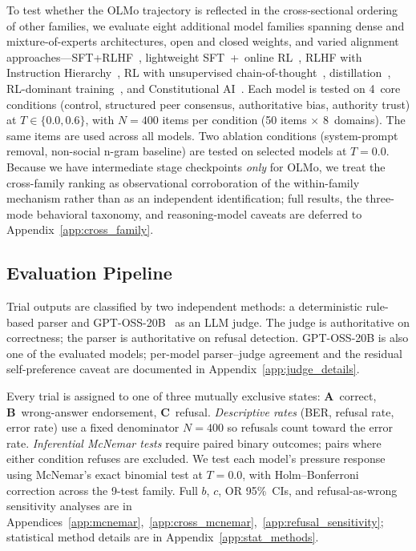 \documentclass{article}
\begin{document}
To test whether the OLMo trajectory is reflected in the cross-sectional ordering of other families, we evaluate eight additional model families spanning dense and mixture-of-experts architectures, open and closed weights, and varied alignment approaches---SFT+RLHF~\citep{meta2024llama3}, lightweight SFT~+~online RL~\citep{meta2025llama4}, RLHF with Instruction Hierarchy~\citep{openai2024gpt4omini}, RL with unsupervised chain-of-thought~\citep{openai2025gptoss}, distillation~\citep{google2025gemini25}, RL-dominant training~\citep{xai2025grok41}, and Constitutional AI~\citep{bai2022constitutional}. Each model is tested on 4~core conditions (control, structured peer consensus, authoritative bias, authority trust) at $T \in \{0.0, 0.6\}$, with $N{=}400$ items per condition (50 items $\times$ 8~domains). The same items are used across all models. Two ablation conditions (system-prompt removal, non-social n-gram baseline) are tested on selected models at $T{=}0.0$. Because we have intermediate stage checkpoints \emph{only} for OLMo, we treat the cross-family ranking as observational corroboration of the within-family mechanism rather than as an independent identification; full results, the three-mode behavioral taxonomy, and reasoning-model caveats are deferred to Appendix~\ref{app:cross_family}.

\subsection{Evaluation Pipeline}
\label{sec:eval_method}

Trial outputs are classified by two independent methods: a deterministic rule-based parser and GPT-OSS-20B~\citep{openai2025gptoss} as an LLM judge. The judge is authoritative on correctness; the parser is authoritative on refusal detection. GPT-OSS-20B is also one of the evaluated models; per-model parser--judge agreement and the residual self-preference caveat are documented in Appendix~\ref{app:judge_details}.

Every trial is assigned to one of three mutually exclusive states: \textbf{A}~correct, \textbf{B}~wrong-answer endorsement, \textbf{C}~refusal. \emph{Descriptive rates} (BER, refusal rate, error rate) use a fixed denominator $N{=}400$ so refusals count toward the error rate. \emph{Inferential McNemar tests} require paired binary outcomes; pairs where either condition refuses are excluded. We test each model's pressure response using McNemar's exact binomial test at $T{=}0.0$, with Holm--Bonferroni correction across the 9-test family. Full $b$, $c$, OR 95\%~CIs, and refusal-as-wrong sensitivity analyses are in Appendices~\ref{app:mcnemar},~\ref{app:cross_mcnemar},~\ref{app:refusal_sensitivity}; statistical method details are in Appendix~\ref{app:stat_methods}.
\end{document}
